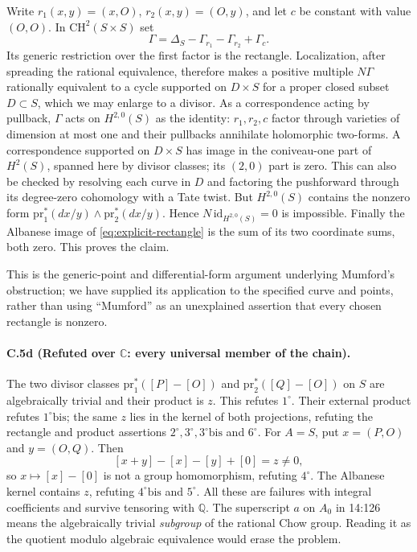 Write $r_1(x,y)=(x,O)$, $r_2(x,y)=(O,y)$, and let $c$ be constant
with value $(O,O)$. In $\mathrm{CH}^2(S\times S)$ set
\[
 \Gamma=\Delta_S-\Gamma_{r_1}-\Gamma_{r_2}+\Gamma_c.
\]
Its generic restriction over the first factor is the rectangle.
Localization, after spreading the rational equivalence, therefore
makes a positive multiple $N\Gamma$ rationally equivalent to a
cycle supported on $D\times S$ for a proper closed subset
$D\subset S$, which we may enlarge to a divisor. As a correspondence
acting by pullback, $\Gamma$ acts on $H^{2,0}(S)$ as the identity:
$r_1,r_2,c$ factor through varieties of dimension at most one and
their pullbacks annihilate holomorphic two-forms. A correspondence
supported on $D\times S$ has image in the coniveau-one part of
$H^2(S)$, spanned here by divisor classes; its $(2,0)$ part is zero.
This can also be checked by resolving each curve in $D$ and factoring
the pushforward through its degree-zero cohomology with a Tate twist.
But $H^{2,0}(S)$ contains the nonzero form
$\mathrm{pr}_1^*(dx/y)\wedge\mathrm{pr}_2^*(dx/y)$. Hence
$N\,\mathrm{id}_{H^{2,0}(S)}=0$ is impossible. Finally the Albanese
image of \eqref{eq:explicit-rectangle} is the sum of its two
coordinate sums, both zero. This proves the claim.

This is the generic-point and differential-form argument underlying
Mumford's obstruction; we have supplied its application to the
specified curve and points, rather than using ``Mumford'' as an
unexplained assertion that every chosen rectangle is nonzero.

\paragraph{C.5d (Refuted over $\mathbb C$: every universal member of the chain).}
The two divisor classes
$\mathrm{pr}_1^*([P]-[O])$ and $\mathrm{pr}_2^*([Q]-[O])$ on $S$ are
algebraically trivial and their product is $z$. This refutes
$1^\circ$. Their external product refutes $1^\circ\mathrm{bis}$;
the same $z$ lies in the kernel of both projections, refuting the
rectangle and product assertions $2^\circ,3^\circ,3^\circ\mathrm{bis}$
and $6^\circ$. For $A=S$, put $x=(P,O)$ and $y=(O,Q)$. Then
\[
 [x+y]-[x]-[y]+[0]=z\ne0,
\]
so $x\mapsto[x]-[0]$ is not a group homomorphism, refuting
$4^\circ$. The Albanese kernel contains $z$, refuting
$4^\circ\mathrm{bis}$ and $5^\circ$. All these are failures with
integral coefficients and survive tensoring with $\mathbb Q$.
The superscript $a$ on $A_0$ in 14:126 means the algebraically
trivial \emph{subgroup} of the rational Chow group. Reading it as
the quotient modulo algebraic equivalence would erase the problem.

